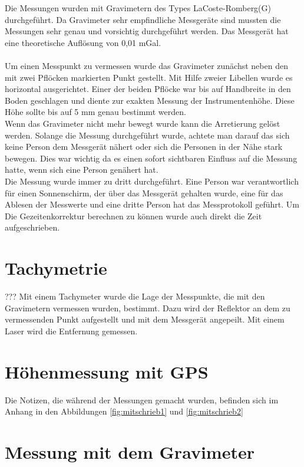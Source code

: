 Die Messungen wurden mit Gravimetern des Types LaCoste-Romberg(G) durchgeführt. Da Gravimeter sehr empfindliche Messgeräte sind mussten die Messungen sehr genau und vorsichtig durchgeführt werden. Das Messgerät hat eine 
theoretische Auflösung von 0,01 mGal.\\
\\
Um einen Messpunkt zu vermessen wurde das Gravimeter zunächst neben den mit zwei Pflöcken markierten Punkt gestellt. Mit Hilfe zweier Libellen wurde es horizontal ausgerichtet. Einer der beiden Pflöcke 
war bis auf Handbreite in den Boden geschlagen und diente zur exakten Messung der Instrumentenhöhe. Diese Höhe sollte bis auf 5 mm genau bestimmt werden.\\
Wenn das Gravimeter nicht mehr bewegt wurde kann die Arretierung gelöst werden. Solange die Messung durchgeführt wurde, achtete man darauf das sich keine Person dem Messgerät nähert oder sich die Personen in der 
Nähe stark bewegen. Dies war wichtig da es einen sofort sichtbaren Einfluss auf die Messung hatte, wenn sich eine Person genähert hat.\\
Die Messung wurde immer zu dritt durchgeführt. Eine Person war verantwortlich für einen Sonnenschirm, der über das Messgerät gehalten wurde, eine für das Ablesen der Messwerte 
und eine dritte Person hat das Messprotokoll geführt. Um Die Gezeitenkorrektur berechnen zu können wurde auch direkt die Zeit aufgeschrieben.\\


\section{Tachymetrie}???
Mit einem Tachymeter wurde die Lage der Messpunkte, die mit den Gravimetern vermessen wurden, bestimmt. Dazu wird der Reflektor an dem zu vermessenden Punkt aufgestellt und mit dem Messgerät angepeilt. Mit einem Laser 
wird die Entfernung gemessen.

\section{Höhenmessung mit GPS}









Die Notizen, die während der Messungen gemacht wurden, befinden sich im Anhang in den Abbildungen \ref{fig:mitschrieb1} und \ref{fig:mitschrieb2}

\section{Messung mit dem Gravimeter}

